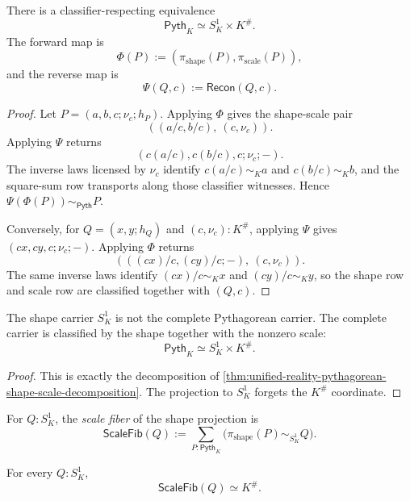 \begin{theorem}
\label{thm:unified-reality-pythagorean-shape-scale-decomposition}
There is a classifier-respecting equivalence
$$
\mathsf{Pyth}_K\simeq S^1_K\times K^\#.
$$
The forward map is
$$
\Phi(P):=(\pi_{\mathrm{shape}}(P),\pi_{\mathrm{scale}}(P)),
$$
and the reverse map is
$$
\Psi(Q,c):=\mathsf{Recon}(Q,c).
$$
\end{theorem}

\begin{proof}
Let $P=(a,b,c;\nu_c;h_P)$. Applying $\Phi$ gives the shape-scale pair
$$
\left((a/c,b/c),\ (c,\nu_c)\right).
$$
Applying $\Psi$ returns
$$
(c(a/c),c(b/c),c;\nu_c;-).
$$
The inverse laws licensed by $\nu_c$ identify $c(a/c)\sim_Ka$ and
$c(b/c)\sim_Kb$, and the square-sum row transports along those
classifier witnesses. Hence $\Psi(\Phi(P))\sim_{\mathsf{Pyth}}P$.

Conversely, for $Q=(x,y;h_Q)$ and $(c,\nu_c):K^\#$, applying $\Psi$
gives $(cx,cy,c;\nu_c;-)$. Applying $\Phi$ returns
$$
\left(((cx)/c,(cy)/c;-),\ (c,\nu_c)\right).
$$
The same inverse laws identify $(cx)/c\sim_Kx$ and $(cy)/c\sim_Ky$, so
the shape row and scale row are classified together with $(Q,c)$.
\end{proof}

\begin{corollary}
\label{cor:unified-reality-unit-circle-readout-not-complete}
The shape carrier $S^1_K$ is not the complete Pythagorean carrier. The
complete carrier is classified by the shape together with the nonzero
scale:
$$
\mathsf{Pyth}_K\simeq S^1_K\times K^\#.
$$
\end{corollary}

\begin{proof}
This is exactly the decomposition of
\autoref{thm:unified-reality-pythagorean-shape-scale-decomposition}.
The projection to $S^1_K$ forgets the $K^\#$ coordinate.
\end{proof}

\begin{definition}
\label{def:unified-reality-pythagorean-scale-fiber}
For $Q:S^1_K$, the \emph{scale fiber} of the shape projection is
$$
\mathsf{ScaleFib}(Q)
:=
\sum_{P:\mathsf{Pyth}_K}
\bigl(\pi_{\mathrm{shape}}(P)\sim_{S^1_K}Q\bigr).
$$
\end{definition}

\begin{theorem}
\label{thm:unified-reality-pythagorean-scale-fiber-classification}
For every $Q:S^1_K$,
$$
\mathsf{ScaleFib}(Q)\simeq K^\#.
$$
\end{theorem}

